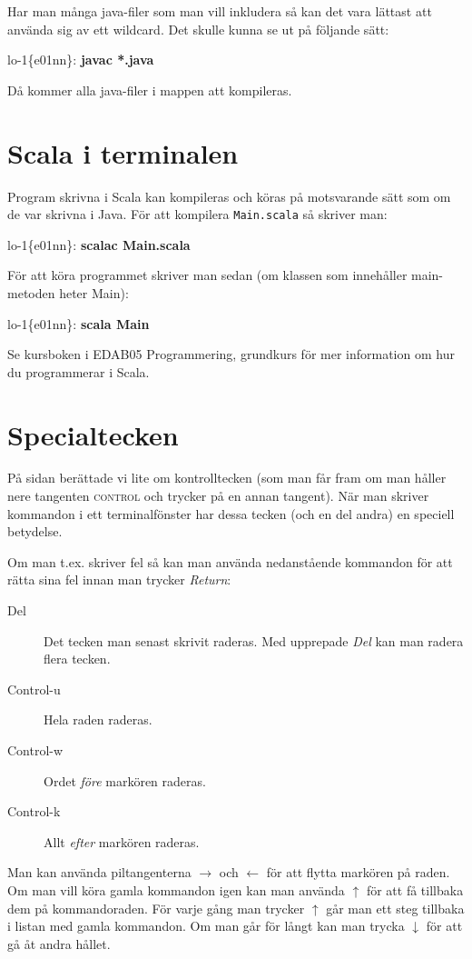 \documentclass[a4paper,twocolumn]{book}
\begin{document}
Har man många java-filer som man vill inkludera så kan det vara lättast att
använda sig av ett wildcard. Det skulle kunna se ut på följande sätt:
\begin{example}
  lo-1\{e01nn\}: \textbf{javac *.java}
\end{example}
Då kommer alla java-filer i mappen att kompileras.

\section{Scala i terminalen}
Program skrivna i Scala kan kompileras och köras på motsvarande sätt som om de var skrivna i Java. För att kompilera \texttt{Main.scala} så skriver man:
\begin{example}
  lo-1\{e01nn\}: \textbf{scalac Main.scala}
\end{example}
För att köra programmet skriver man sedan (om klassen som innehåller main-metoden heter Main):
\begin{example}
  lo-1\{e01nn\}: \textbf{scala Main}
\end{example}

Se kursboken i EDAB05 Programmering, grundkurs för mer information om hur du programmerar i Scala.


\section{Specialtecken}

På sidan \pageref{control} berättade vi lite om
kontrolltecken (som man får fram om man håller nere tangenten
\textsc{control} och trycker på en annan tangent). När man skriver
kommandon i ett terminalfönster har dessa tecken (och en del andra) en
speciell betydelse.

Om man t.ex. skriver fel så kan man använda nedanstående kommandon för
att rätta sina fel innan man trycker \emph{Return}:
\begin{description}
  \item[Del] Det tecken man senast skrivit raderas. Med upprepade
    \emph{Del} kan man radera flera tecken.
  \item[Control-u] Hela raden raderas.
  \item[Control-w] Ordet \emph{före} markören raderas.
  \item[Control-k] Allt \emph{efter} markören raderas.
\end{description}
Man kan använda piltangenterna $\rightarrow$ och $\leftarrow$ för att
flytta markören på raden. Om man vill köra gamla kommandon igen kan
man använda $\uparrow$ för att få tillbaka dem på kommandoraden. För
varje gång man trycker $\uparrow$ går man ett steg tillbaka i listan
med gamla kommandon. Om man går för långt kan man trycka $\downarrow$
för att gå åt andra hållet.
\end{document}
